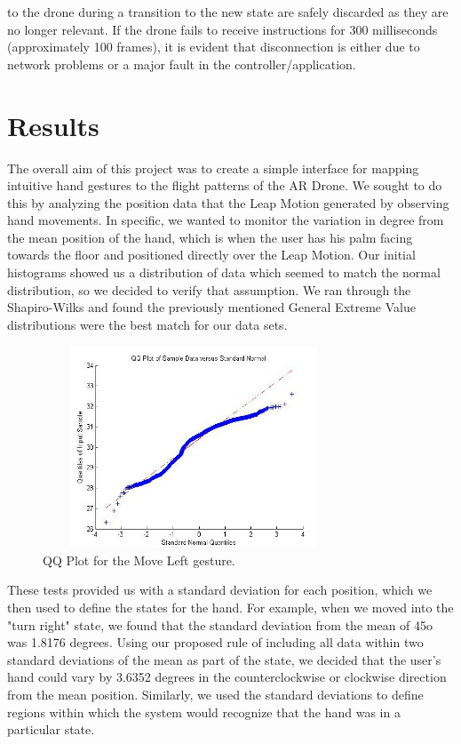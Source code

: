 \documentclass[letterpaper,english, 12pt]{article}
\begin{document}
to the drone during a transition to the new state are safely discarded as they are no longer relevant. If the drone fails to receive instructions for 300 milliseconds (approximately 100 frames), it  is evident that disconnection is either due to network problems or a major fault in the controller/application. 


\section*{Results}

The overall aim of this project was to create a simple interface for mapping intuitive hand gestures to the flight patterns of the AR Drone. We sought to do this by analyzing the position data that the Leap Motion generated by observing hand movements. In specific, we wanted to monitor the variation in degree from the mean position of the hand, which is when the user has his palm facing towards the floor and positioned directly over the Leap Motion. Our initial histograms showed us a distribution of data which seemed to match the normal distribution, so we decided to verify that assumption. We ran through the Shapiro-Wilks and found the previously mentioned General Extreme Value distributions were the best match for our data sets.

\begin{figure}[t]
	\centering
	\includegraphics[height=6cm,width=90mm]{pics/qqLeft.jpg}
	\caption{QQ Plot for the Move Left gesture.}
\end{figure}

These tests provided us with a standard deviation for each position, which we then used to define the states for the hand. For example, when we moved into the "turn right" state, we found that the standard deviation from the mean of 45o was 1.8176 degrees. Using our proposed rule of including all data within two standard deviations of the mean as part of the state, we decided that the user's hand could vary by 3.6352 degrees in the counterclockwise or clockwise direction from the mean position. Similarly, we used the standard deviations to define regions within which the system would recognize that the hand was in a particular state.
\end{document}
